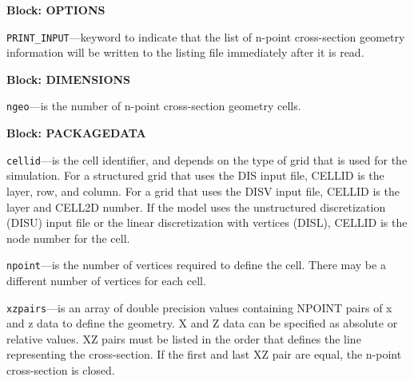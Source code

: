 
\item \textbf{Block: OPTIONS}

\begin{description}
\item \texttt{PRINT\_INPUT}---keyword to indicate that the list of n-point cross-section geometry information will be written to the listing file immediately after it is read.

\end{description}
\item \textbf{Block: DIMENSIONS}

\begin{description}
\item \texttt{ngeo}---is the number of n-point cross-section geometry cells.

\end{description}
\item \textbf{Block: PACKAGEDATA}

\begin{description}
\item \texttt{cellid}---is the cell identifier, and depends on the type of grid that is used for the simulation.  For a structured grid that uses the DIS input file, CELLID is the layer, row, and column.   For a grid that uses the DISV input file, CELLID is the layer and CELL2D number.  If the model uses the unstructured discretization (DISU) input file or the linear discretization with vertices (DISL), CELLID is the node number for the cell.

\item \texttt{npoint}---is the number of vertices required to define the cell.  There may be a different number of vertices for each cell.

\item \texttt{xzpairs}---is an array of double precision values containing NPOINT pairs of x and z data to define the geometry.  X and Z data can be specified as absolute or relative values. XZ pairs must be listed in the order that defines the line representing the cross-section. If the first and last XZ pair are equal, the n-point cross-section is closed.

\end{description}


